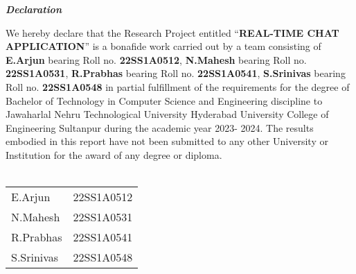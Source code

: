 \documentclass[12pt,a4paper]{report}
\begin{document}
\newpage
{} 
\begin{center}
{\LARGE \textbf{\textit{Declaration}}}
\end{center} 
\vspace{2cm}
{\large We hereby declare that the Research Project entitled “\textbf{REAL-TIME CHAT APPLICATION}” is a bonafide work carried out by a team consisting of \textbf {E.Arjun} bearing Roll no. \textbf{22SS1A0512},  \textbf{N.Mahesh} bearing Roll no. \textbf{22SS1A0531},  \textbf{R.Prabhas} bearing Roll no. \textbf{22SS1A0541},
\textbf{S.Srinivas} bearing Roll no. \textbf{22SS1A0548} in partial fulfillment of the requirements for the degree of Bachelor of Technology in Computer Science and Engineering discipline to  Jawaharlal Nehru Technological University Hyderabad University College of Engineering Sultanpur during the academic year 2023- 2024. The results embodied in this report have not been submitted to any other University or Institution for the award of any degree or diploma.}\\ \\
\vspace{4.0cm}
\begin{table}[ht]
 \begin{flushright}
  \begin{tabular}{l r}
  {\large E.Arjun} & {\large 22SS1A0512}\\
  {\large N.Mahesh} & {\large 22SS1A0531}\\
  {\large R.Prabhas} & {\large 22SS1A0541}\\
   {\large S.Srinivas} & {\large 22SS1A0548}\\
  
 \end{tabular}
 \end{flushright}
\end{table}
\end{document}
